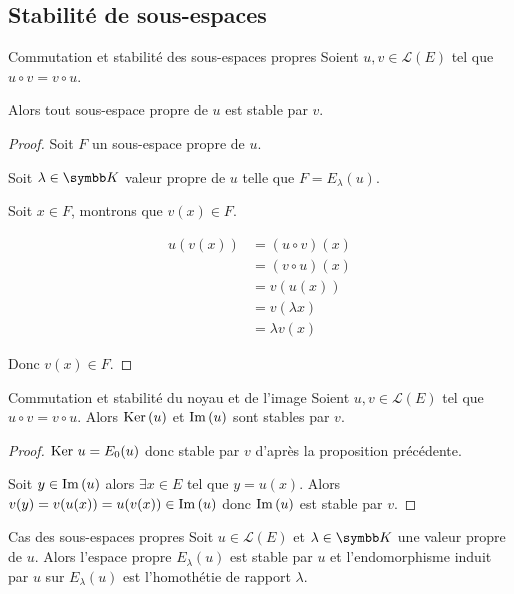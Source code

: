 \subsection{Stabilité de sous-espaces }

\begin{proposition}{Commutation et stabilité des sous-espaces propres}{}
    Soient $u, v \in \mathscr L(E)$ tel que $u \circ v = v \circ u$.

    Alors tout sous-espace propre de $u$ est stable par $v$.
\end{proposition}

\begin{proof}
    Soit $F$ un sous-espace propre de $u$. 

    Soit $\lambda \in \K$ valeur propre de $u$ telle que $F = E_\lambda(u)$.

    Soit $x \in F$, montrons que $v(x) \in F$.

    \begin{align}
        u(v(x)) & = (u \circ v)(x) \\
                & = (v \circ u)(x) \\
                & = v(u(x)) \\
                & = v(\lambda x) \\
                & = \lambda v(x)
    \end{align}

    Donc $v(x) \in F$.
\end{proof}

\begin{proposition}{Commutation et stabilité du noyau et de l'image}{}
    Soient $u, v \in \mathscr L(E)$ tel que $u \circ v = v \circ u$. Alors $\operatorname{Ker} \,(u)$ et
    $\operatorname{Im} \,(u)$ sont stables par $v$.
\end{proposition}

\begin{proof}
    $\operatorname{Ker} \, u = E_0(u)$ donc stable par $v$ d'après la proposition précédente.

    Soit $y \in \operatorname{Im} \,(u)$ alors $\exists x \in E$ tel que $y = u(x)$. Alors 
    $v(y) = v(u(x)) = u(v(x)) \in \operatorname{Im} \,(u)$ donc $\operatorname{Im} \,(u)$ est stable par $v$.
\end{proof}

\begin{proposition}{Cas des sous-espaces propres}{}
    Soit $u \in \mathscr L(E)$ et $\lambda \in \K$ une valeur propre de $u$. 
    Alors l'espace propre $E_\lambda(u)$ est stable par $u$ et l'endomorphisme induit par $u$ 
    sur $E_\lambda(u)$ est l'homothétie de rapport $\lambda$.
\end{proposition}

